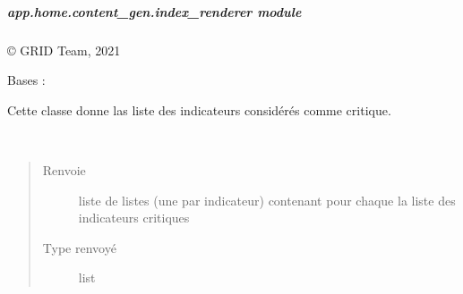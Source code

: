 \documentclass[letterpaper,10pt,french]{sphinxmanual}
\begin{document}
\subparagraph{app.home.content\_gen.index\_renderer module}
\label{\detokenize{app.home.content_gen:module-app.home.content_gen.index_renderer}}\label{\detokenize{app.home.content_gen:app-home-content-gen-index-renderer-module}}
\sphinxAtStartPar
© GRID Team, 2021

\begin{fulllineitems}
\label{\detokenize{app.home.content_gen:app.home.content_gen.index_renderer.CriticalAlert}}
\sphinxAtStartPar
Bases : 

\sphinxAtStartPar
Cette classe donne las liste des indicateurs considérés comme critique.

\begin{fulllineitems}
\label{\detokenize{app.home.content_gen:app.home.content_gen.index_renderer.CriticalAlert.main}}~\begin{quote}\begin{description}
\item[{Renvoie}] \leavevmode
\sphinxAtStartPar
liste de listes (une par indicateur) contenant pour chaque la liste des indicateurs critiques

\item[{Type renvoyé}] \leavevmode
\sphinxAtStartPar
list

\end{description}\end{quote}

\end{fulllineitems}


\end{fulllineitems}

\end{document}
